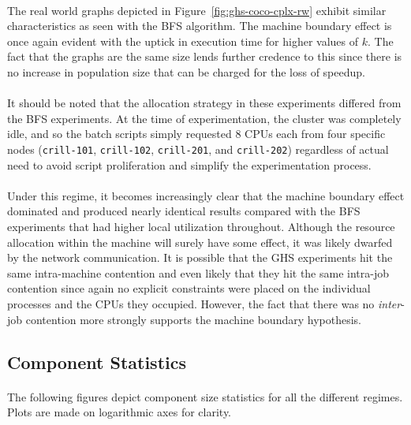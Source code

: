 \documentclass[11pt,epsf]{article}
\begin{document}
{{    \paragraph{}{
      The real world graphs depicted in Figure~\ref{fig:ghs-coco-cplx-rw} exhibit similar
      characteristics as seen with the BFS algorithm. The machine boundary effect is once again evident
      with the uptick in execution time for higher values of $k$. The fact that the graphs are the same
      size lends further credence to this since there is no increase in population size that can be
      charged for the loss of speedup.
    }
    \paragraph{}{
      It should be noted that the allocation strategy in these experiments differed from the BFS experiments.
      At the time of experimentation, the cluster was completely idle, and so the batch scripts
      simply requested 8 CPUs each from four specific nodes (\texttt{crill-101}, \texttt{crill-102},
      \texttt{crill-201}, and \texttt{crill-202}) regardless of actual need to avoid script proliferation
      and simplify the experimentation process.
    }
    \paragraph{}{
      Under this regime, it becomes increasingly clear that the machine boundary effect dominated
      and produced nearly identical results compared with the BFS experiments that had higher
      local utilization throughout. Although the resource allocation within the machine will
      surely have some effect, it was likely dwarfed by the network communication. It is possible
      that the GHS experiments hit the same intra-machine contention and even likely that they hit
      the same intra-job contention since again no explicit constraints were placed on the individual
      processes and the CPUs they occupied. However, the fact that there was no \emph{inter}-job contention
      more strongly supports the machine boundary hypothesis.
    }
  }
  \subsection{Component Statistics}{
    \paragraph{}{
      The following figures depict component size statistics for all the different regimes.
      Plots are made on logarithmic axes for clarity.
    }
}}
\end{document}

